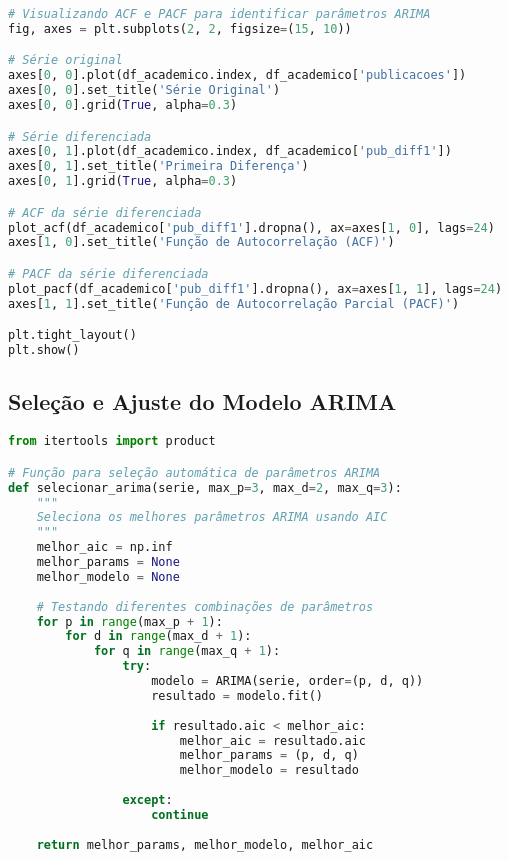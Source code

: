 \begin{pythonbox}
\begin{lstlisting}[language=Python]
# Visualizando ACF e PACF para identificar parâmetros ARIMA
fig, axes = plt.subplots(2, 2, figsize=(15, 10))

# Série original
axes[0, 0].plot(df_academico.index, df_academico['publicacoes'])
axes[0, 0].set_title('Série Original')
axes[0, 0].grid(True, alpha=0.3)

# Série diferenciada
axes[0, 1].plot(df_academico.index, df_academico['pub_diff1'])
axes[0, 1].set_title('Primeira Diferença')
axes[0, 1].grid(True, alpha=0.3)

# ACF da série diferenciada
plot_acf(df_academico['pub_diff1'].dropna(), ax=axes[1, 0], lags=24)
axes[1, 0].set_title('Função de Autocorrelação (ACF)')

# PACF da série diferenciada
plot_pacf(df_academico['pub_diff1'].dropna(), ax=axes[1, 1], lags=24)
axes[1, 1].set_title('Função de Autocorrelação Parcial (PACF)')

plt.tight_layout()
plt.show()
\end{lstlisting}
\end{pythonbox}

\subsection{Seleção e Ajuste do Modelo ARIMA}

\begin{pythonbox}
\begin{lstlisting}[language=Python]
from itertools import product

# Função para seleção automática de parâmetros ARIMA
def selecionar_arima(serie, max_p=3, max_d=2, max_q=3):
    """
    Seleciona os melhores parâmetros ARIMA usando AIC
    """
    melhor_aic = np.inf
    melhor_params = None
    melhor_modelo = None
    
    # Testando diferentes combinações de parâmetros
    for p in range(max_p + 1):
        for d in range(max_d + 1):
            for q in range(max_q + 1):
                try:
                    modelo = ARIMA(serie, order=(p, d, q))
                    resultado = modelo.fit()
                    
                    if resultado.aic < melhor_aic:
                        melhor_aic = resultado.aic
                        melhor_params = (p, d, q)
                        melhor_modelo = resultado
                        
                except:
                    continue
    
    return melhor_params, melhor_modelo, melhor_aic
\end{lstlisting}
\end{pythonbox}

